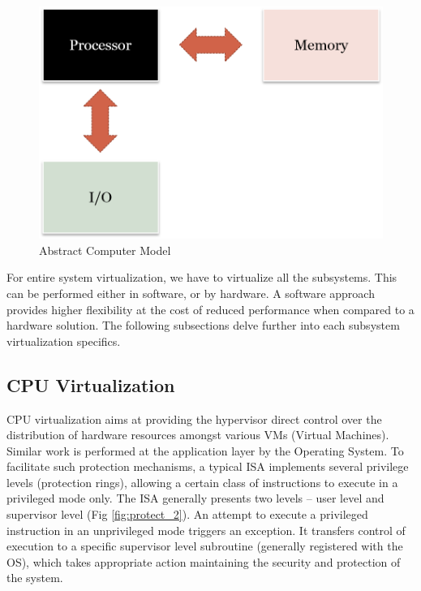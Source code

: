 \setlength{\belowcaptionskip}{-10pt}

\begin{figure}[H]
  \centering
  \includegraphics[scale=0.8]{figures/Mem_IO_CPU.png}
  \caption{Abstract Computer Model}
  \label{fig:mem_io}
\end{figure}
For entire system virtualization, we have to virtualize all the subsystems. This can be performed either in software, or by hardware. A software approach provides higher flexibility at the cost of reduced performance when compared to a hardware solution. The following subsections delve further into each subsystem virtualization specifics.

\subsection{CPU Virtualization}
CPU virtualization aims at providing the hypervisor direct control over the distribution of hardware resources amongst various VMs (Virtual Machines). Similar work is performed at the application layer by the Operating System. To facilitate such protection mechanisms, a typical ISA implements several privilege levels (protection rings), allowing a certain class of instructions to execute in a privileged mode only. The ISA generally presents two levels -- user level and supervisor level (Fig \ref{fig:protect_2}). An attempt to execute a privileged instruction in an unprivileged mode triggers an exception. It transfers control of execution to a specific supervisor level subroutine (generally registered with the OS), which takes appropriate action maintaining the security and protection of the system.

\setlength{\belowcaptionskip}{-10pt}

